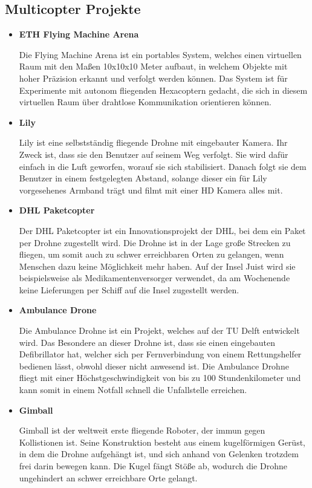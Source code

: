   \subsection*{Multicopter Projekte}
  \begin{itemize}
      \item \textbf{ETH Flying Machine Arena}

      Die {Flying Machine Arena\cite{eth}} ist ein portables System, welches einen virtuellen Raum mit den Maßen 10x10x10 Meter aufbaut, in welchem
      Objekte mit hoher Präzision erkannt und verfolgt werden können. Das System ist für Experimente mit autonom fliegenden Hexacoptern
      gedacht, die sich in diesem virtuellen Raum über drahtlose Kommunikation orientieren können.

      \item \textbf{Lily}

      {Lily\cite{lily}} ist eine selbstständig fliegende Drohne mit eingebauter Kamera. Ihr Zweck ist, dass sie den Benutzer auf seinem Weg verfolgt.
      Sie wird dafür einfach in die Luft geworfen, worauf sie sich stabilisiert. Danach folgt sie dem Benutzer in einem festgelegten Abstand, solange dieser ein für Lily
      vorgesehenes Armband trägt und filmt mit einer HD Kamera alles mit.

      \item \textbf{DHL Paketcopter}

      Der {DHL Paketcopter\cite{dhl}} ist ein Innovationsprojekt der DHL, bei dem ein Paket per Drohne zugestellt wird. Die Drohne ist in der Lage große Strecken zu fliegen,
      um somit auch zu schwer erreichbaren Orten zu gelangen, wenn Menschen dazu keine Möglichkeit mehr haben. Auf der Insel Juist wird sie beispielsweise als
      Medikamentenversorger verwendet, da am Wochenende keine Lieferungen per Schiff auf die Insel zugestellt werden.

      \item \textbf{Ambulance Drone}

      Die {Ambulance Drohne\cite{ambulancedrone}} ist ein Projekt, welches auf der TU Delft entwickelt wird. Das Besondere an dieser Drohne ist, dass sie einen eingebauten Defibrillator hat, welcher
      sich per Fernverbindung von einem Rettungshelfer bedienen lässt, obwohl dieser nicht anwesend ist. Die Ambulance Drohne fliegt mit einer Höchstgeschwindigkeit von bis zu
      100 Stundenkilometer und kann somit in einem Notfall schnell die Unfallstelle erreichen.

      \item \textbf{Gimball}

      {Gimball\cite{gimball}} ist der weltweit erste fliegende Roboter, der immun gegen Kollistionen ist. Seine Konstruktion besteht aus einem kugelförmigen Gerüst, in dem die Drohne
      aufgehängt ist, und sich anhand von Gelenken trotzdem frei darin bewegen kann. Die Kugel fängt Stöße ab, wodurch die Drohne ungehindert an schwer erreichbare
      Orte gelangt.

  \end{itemize}

